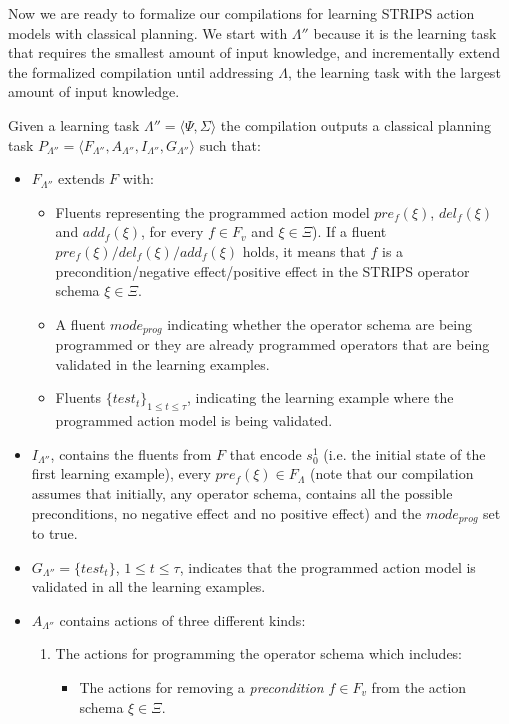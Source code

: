 \documentclass[letterpaper]{article} %
\newcommand{\tup}[1]{{\langle #1 \rangle}}
\begin{document}
Now we are ready to formalize our compilations for learning STRIPS action models with classical planning. We start with $\Lambda''$ because it is the learning task that requires the smallest amount of input knowledge, and incrementally extend the formalized compilation until addressing $\Lambda$, the learning task with the largest amount of input knowledge.

Given a learning task $\Lambda''=\tup{\Psi,\Sigma}$ the compilation outputs a classical planning task $P_{\Lambda''}=\tup{F_{\Lambda''},A_{\Lambda''},I_{\Lambda''},G_{\Lambda''}}$ such that:
\begin{itemize}
\item $F_{\Lambda''}$ extends $F$ with:
\begin{itemize}
\item Fluents representing the programmed action model $pre_f(\xi)$, $del_f(\xi)$ and $add_f(\xi)$, for every $f\in F_v$ and $\xi \in \Xi$). If a fluent $pre_f(\xi)/del_f(\xi)/add_f(\xi)$ holds, it means that $f$ is a precondition/negative effect/positive effect in the STRIPS operator schema $\xi\in \Xi$. 
\item A fluent $mode_{prog}$ indicating whether the operator schema are being programmed or they are already programmed operators that are being validated in the learning examples. 
\item Fluents $\{test_t\}_{1\leq t\leq \tau}$, indicating the learning example where the programmed action model is being validated.
\end{itemize}
\item $I_{\Lambda''}$, contains the fluents from $F$ that encode $s_0^1$ (i.e. the initial state of the first learning example), every $pre_f(\xi)\in F_{\Lambda}$ (note that our compilation assumes that initially, any operator schema, contains all the possible preconditions, no negative effect and no positive effect) and the $mode_{prog}$ set to true. 
\item $G_{\Lambda''}=\{test_t\}$, {\small $1\leq t\leq \tau$}, indicates that the programmed action model is validated in all the learning examples.
\item $A_{\Lambda''}$ contains actions of three different kinds:
\begin{enumerate}
\item The actions for programming the operator schema which includes:
\begin{itemize}
\item The actions for removing a {\em precondition} $f\in F_v$ from the action schema $\xi\in\Xi$. 


\end{itemize}
\end{enumerate}
\end{itemize}
\end{document}
